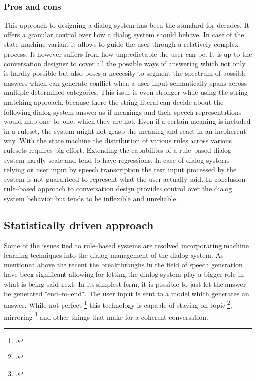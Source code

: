 \documentclass[12pt]{report}
\begin{document}
{\subsubsection{Pros and cons}

\par
This approach to designing a dialog system
has been the standard for decades.
It offers a granular control over how a dialog system should behave.
In case of the state machine variant it
allows to guide the user through a relatively complex process.
It however suffers from how unpredictable the user can be.
It is up to the conversation designer to cover all the possible ways of answering
which not only is hardly possible
but also poses a neccesity to segment the spectrum of possible answers
which can generate conflict when
a user input semantically spans across multiple determined categories.
This issue is even stronger while using the string matching approach,
because there the string literal can decide about the following dialog system answer
as if meanings and their speech representations would map one–to–one,
which they are not.
Even if a certain meaning is included in a ruleset,
the system might not grasp the meaning and react in an incoherent way.
With the state machine the
distribution of various rules across various rulesets
requires big effort.
Extending the capabilites of a rule–based dialog system
hardly scale and tend to have regressions.
In case of dialog systems relying on user input by speech transcription
the text input processed by the system is not guaranteed to represent
what the user actually said.
In conclusion rule–based approach to conversation design
provides control over the dialog system behavior
but tends to be inflexible and unreliable.

\subsection{Statistically driven approach}

Some of the issues tied to rule–based systems
are resolved incorporating machine learning techniques into the dialog management of the dialog system.
As mentioned above the recent the breakthroughs in the field
of speech generation have been significant
allowing for letting the dialog system play a bigger role
in what is being said next.
In its simplest form,
it is possible to just let the answer be generated "end–to–end".
The user input is sent to a model which generates an answer.
While not perfect \footcite{tie2024llms}
this technology is capable of staying on topic \footcite{sreedhar2024canttalkaboutthisaligninglanguagemodels},
mirroring \footcite{ivey2024real}
and other things that make for a coherent conversation.

}
\end{document}
